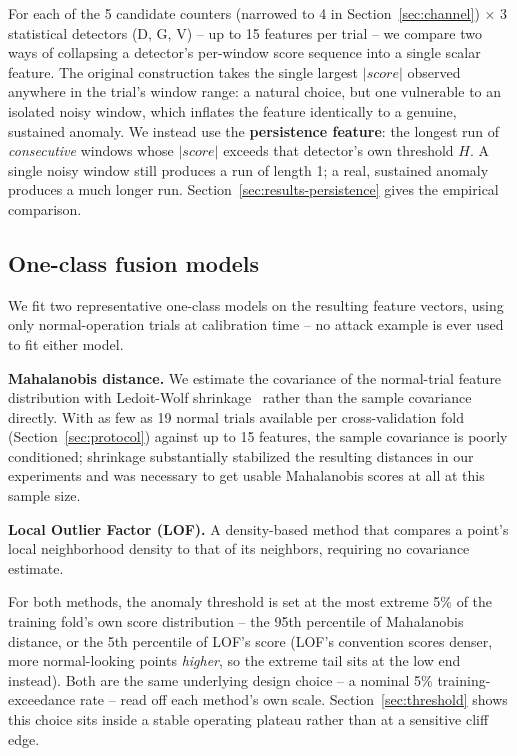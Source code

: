 \documentclass[conference]{IEEEtran}
\begin{document}
For each of the 5 candidate counters (narrowed to 4 in Section~\ref{sec:channel}) $\times$ 3 statistical detectors (D, G, V) -- up to 15 features per trial -- we compare two ways of collapsing a detector's per-window score sequence into a single scalar feature. The original construction takes the single largest $|score|$ observed anywhere in the trial's window range: a natural choice, but one vulnerable to an isolated noisy window, which inflates the feature identically to a genuine, sustained anomaly. We instead use the \textbf{persistence feature}: the longest run of \emph{consecutive} windows whose $|score|$ exceeds that detector's own threshold $H$. A single noisy window still produces a run of length 1; a real, sustained anomaly produces a much longer run. Section~\ref{sec:results-persistence} gives the empirical comparison.

\subsection{One-class fusion models}

We fit two representative one-class models on the resulting feature vectors, using only normal-operation trials at calibration time -- no attack example is ever used to fit either model.

\textbf{Mahalanobis distance.} We estimate the covariance of the normal-trial feature distribution with Ledoit-Wolf shrinkage~\cite{ledoitwolf2004} rather than the sample covariance directly. With as few as 19 normal trials available per cross-validation fold (Section~\ref{sec:protocol}) against up to 15 features, the sample covariance is poorly conditioned; shrinkage substantially stabilized the resulting distances in our experiments and was necessary to get usable Mahalanobis scores at all at this sample size.

\textbf{Local Outlier Factor (LOF).} A density-based method that compares a point's local neighborhood density to that of its neighbors, requiring no covariance estimate.

For both methods, the anomaly threshold is set at the most extreme 5\% of the training fold's own score distribution -- the 95th percentile of Mahalanobis distance, or the 5th percentile of LOF's score (LOF's convention scores denser, more normal-looking points \emph{higher}, so the extreme tail sits at the low end instead). Both are the same underlying design choice -- a nominal 5\% training-exceedance rate -- read off each method's own scale. Section~\ref{sec:threshold} shows this choice sits inside a stable operating plateau rather than at a sensitive cliff edge.
\end{document}
